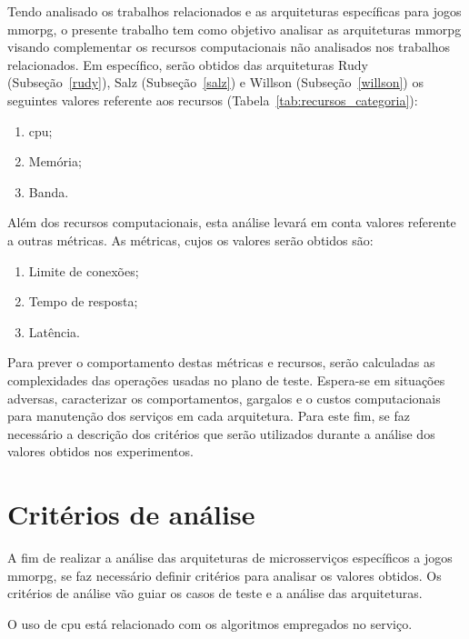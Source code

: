 Tendo analisado os trabalhos relacionados e as arquiteturas específicas para jogos \ac{mmorpg}, o presente trabalho tem como objetivo analisar as arquiteturas \ac{mmorpg} visando complementar os recursos computacionais não analisados nos trabalhos relacionados.
%
Em específico, serão obtidos das arquiteturas Rudy (Subseção~\ref{rudy}), Salz (Subseção~\ref{salz}) e Willson (Subseção~\ref{willson}) os seguintes valores referente aos recursos (Tabela~\ref{tab:recursos_categoria}):

\begin{enumerate}
  \item \ac{cpu};
  \item Memória;
  \item Banda.
\end{enumerate}

Além dos recursos computacionais, esta análise levará em conta valores referente a outras métricas.
%
As métricas, cujos os valores serão obtidos são:

\begin{enumerate}
  \item Limite de conexões;
  \item Tempo de resposta;
  \item Latência.
\end{enumerate}

Para prever o comportamento destas métricas e recursos, serão calculadas as complexidades das operações usadas no plano de teste.
%
Espera-se em situações adversas, caracterizar os comportamentos, gargalos e o custos computacionais para manutenção dos serviços em cada arquitetura.
%
Para este fim, se faz necessário a descrição dos critérios que serão utilizados durante a análise dos valores obtidos nos experimentos.


\section{Critérios de análise}
\label{sec:criterios}

A fim de realizar a análise das arquiteturas de microsserviços específicos a jogos \ac{mmorpg}, se faz necessário definir critérios para analisar os valores obtidos.
%
Os critérios de análise vão guiar os casos de teste e a análise das arquiteturas.

O uso de \ac{cpu} está relacionado com os algoritmos empregados no serviço.

